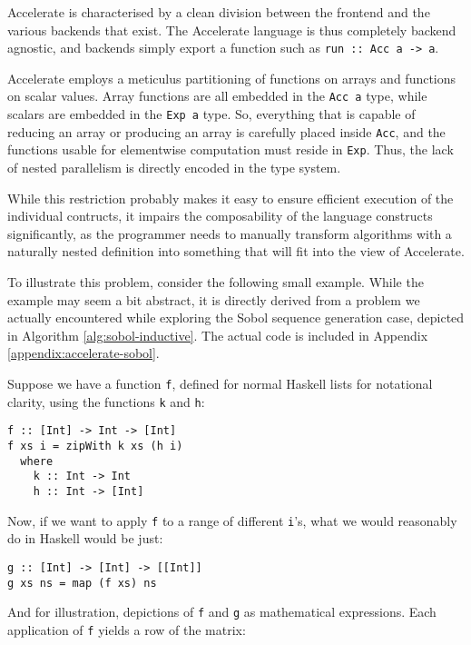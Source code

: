 Accelerate is characterised by a clean division between the frontend and the
various backends that exist. The Accelerate language is thus completely backend
agnostic, and backends simply export a function such as \hbox{\texttt{run :: Acc a ->
a}.}

Accelerate employs a meticulus partitioning of functions on arrays and functions
on scalar values. Array functions are all embedded in the \texttt{Acc a} type,
while scalars are embedded in the \texttt{Exp a} type. So, everything that is
capable of reducing an array or producing an array is carefully placed inside
\texttt{Acc}, and the functions usable for elementwise computation must
reside in \texttt{Exp}. Thus, the lack of nested parallelism is directly
encoded in the type system.

While this restriction probably makes it easy to ensure efficient execution of
the individual contructs, it impairs the composability of the language
constructs significantly, as the programmer needs to manually transform
algorithms with a naturally nested definition into something that will fit into
the view of Accelerate.

To illustrate this problem, consider the following small example.  While the example may seem a bit
abstract, it is directly derived from a problem we actually encountered while exploring
the Sobol sequence generation case, depicted in Algorithm
\ref{alg:sobol-inductive}. The actual code is included in Appendix
\ref{appendix:accelerate-sobol}.

Suppose we have a function \texttt{f}, defined for normal Haskell lists for notational clarity,
using the functions \texttt{k} and \texttt{h}:

\begin{verbatim}
f :: [Int] -> Int -> [Int]
f xs i = zipWith k xs (h i)
  where
    k :: Int -> Int
    h :: Int -> [Int]
\end{verbatim}

Now, if we want to apply \texttt{f} to a range of different \texttt{i}'s, what
we would reasonably do in Haskell would be just:

\begin{verbatim}
g :: [Int] -> [Int] -> [[Int]]
g xs ns = map (f xs) ns
\end{verbatim}

And for illustration, depictions of \texttt{f} and \texttt{g} as mathematical
expressions. Each application of \texttt{f} yields a row of the matrix:

